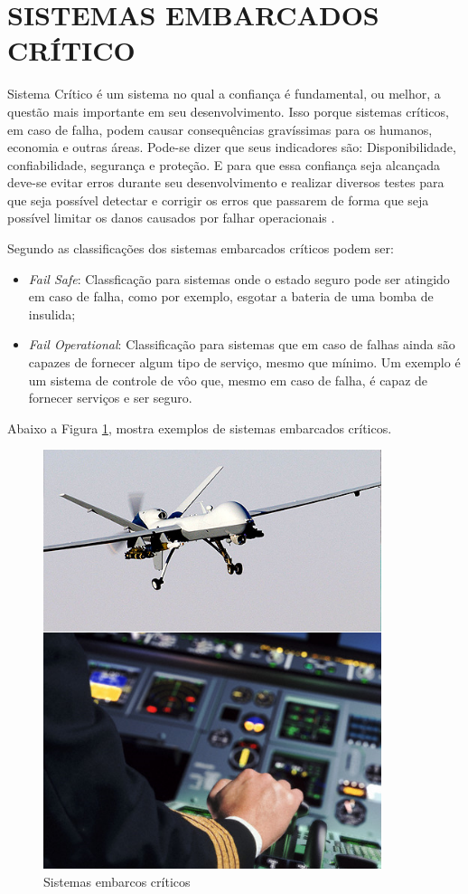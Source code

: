 \section{SISTEMAS EMBARCADOS CRÍTICO}
\label{sec:SistemaEmbarcado}

Sistema Crítico é um sistema no qual a confiança é fundamental, ou melhor, a questão mais importante em seu desenvolvimento. Isso porque sistemas críticos, em caso de falha, podem causar consequências gravíssimas para os humanos, economia e outras áreas. Pode-se dizer que seus indicadores são: Disponibilidade, confiabilidade, segurança e proteção. E para que essa confiança seja alcançada deve-se evitar erros durante seu desenvolvimento e realizar diversos testes para que seja possível detectar e corrigir os erros que passarem de forma que seja possível limitar os danos causados por falhar operacionais \cite{sommerville2004software,feldmann2007survey,jordan2006standard}.

Segundo \cite{kopetz2011real} as classificações dos sistemas embarcados críticos podem ser:
\begin{itemize}
\item \emph{Fail Safe}: Classficação para sistemas onde o estado seguro pode ser atingido em caso de falha, como por exemplo, esgotar a bateria de uma bomba de insulida;
\item \emph{Fail Operational}: Classificação para sistemas que em caso de falhas ainda são capazes de fornecer algum tipo de serviço, mesmo que mínimo. Um exemplo é um sistema de controle de vôo que, mesmo em caso de falha, é capaz de fornecer serviços e ser seguro.
\end{itemize}

Abaixo a Figura \ref{fig:exSistEmbarcado},  mostra exemplos de sistemas embarcados críticos.

\begin{figure}[htp]
	\centering
	\includegraphics[scale=0.7]{images/exemplo_sistemas_embarcados_criticos.png}	
	\caption{Sistemas embarcos críticos}
	\label{fig:exSistEmbarcado}	
\end{figure}

